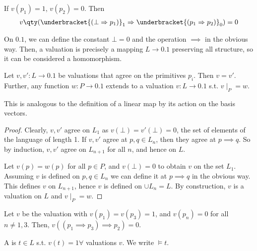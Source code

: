 \begin{example}
    If $v(p_1) = 1$, $v(p_2) = 0$.
    Then \begin{align*}
        v\qty( \underbracket{(\bot \implies p_1)}_{1} \implies \underbracket{(p_1 \implies p_2)}_{0}) = 0
    \end{align*}
\end{example}

\begin{remark}
    On $\qty{0,1}$, we can define the constant $\bot = 0$ and the operation $\implies$ in the obvious way.
    Then, a valuation is precisely a mapping $L \to \qty{0,1}$ preserving all structure, so it can be considered a homomorphism.
\end{remark}

\begin{proposition}
    Let $v, v' \colon L \to \qty{0,1}$ be valuations that agree on the primitives $p_i$.
    Then $v = v'$.
    Further, any function $w \colon P \to \qty{0,1}$ extends to a valuation $v : L \to \qty{0, 1}$ s.t. $v\mid_P = w$.
\end{proposition}

\begin{remark}
    This is analogous to the definition of a linear map by its action on the basis vectors.
\end{remark}

\begin{proof}
    Clearly, $v, v'$ agree on $L_1$ as $v(\bot) = v'(\bot) = 0$, the set of elements of the language of length 1.
    If $v, v'$ agree at $p, q \in L_n$, then they agree at $p \implies q$.
    So by induction, $v, v'$ agree on $L_{n+1}$ for all $n$, and hence on $L$.

    Let $v(p) = w(p)$ for all $p \in P$, and $v(\bot) = 0$ to obtain $v$ on the set $L_1$.
    Assuming $v$ is defined on $p, q \in L_n$ we can define it at $p \implies q$ in the obvious way.
    This defines $v$ on $L_{n+1}$, hence $v$ is defined on $\cup L_n = L$.
    By construction, $v$ is a valuation on $L$ and $v \mid_P = w$.
\end{proof}

\begin{example}
    Let $v$ be the valuation with $v(p_1) = v(p_3) = 1$, and $v(p_n) = 0$ for all $n \neq 1, 3$.
    Then, $v((p_1 \implies p_3) \implies p_2) = 0$.
\end{example}

\begin{definition}[Tautology]
    A  is $t \in L$ s.t. $v(t) = 1 \forall$ valuations $v$.
    We write $\models t$.
\end{definition}

